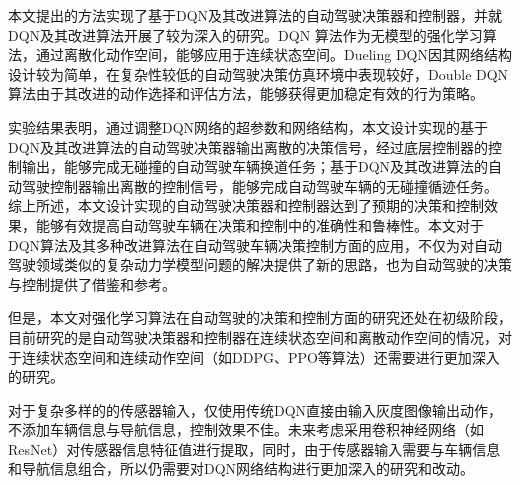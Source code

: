 %
%
%
%
%
%

\renewcommand{\thechapter}{结论}



本文提出的方法实现了基于DQN及其改进算法的自动驾驶决策器和控制器，并就DQN及其改进算法开展了较为深入的研究。DQN 算法作为无模型的强化学习算法，通过离散化动作空间，能够应用于连续状态空间。Dueling DQN因其网络结构设计较为简单，在复杂性较低的自动驾驶决策仿真环境中表现较好，Double DQN算法由于其改进的动作选择和评估方法，能够获得更加稳定有效的行为策略。

实验结果表明，通过调整DQN网络的超参数和网络结构，本文设计实现的基于DQN及其改进算法的自动驾驶决策器输出离散的决策信号，经过底层控制器的控制输出，能够完成无碰撞的自动驾驶车辆换道任务；基于DQN及其改进算法的自动驾驶控制器输出离散的控制信号，能够完成自动驾驶车辆的无碰撞循迹任务。
综上所述，本文设计实现的自动驾驶决策器和控制器达到了预期的决策和控制效果，能够有效提高自动驾驶车辆在决策和控制中的准确性和鲁棒性。本文对于DQN算法及其多种改进算法在自动驾驶车辆决策控制方面的应用，不仅为对自动驾驶领域类似的复杂动力学模型问题的解决提供了新的思路，也为自动驾驶的决策与控制提供了借鉴和参考。

但是，本文对强化学习算法在自动驾驶的决策和控制方面的研究还处在初级阶段，目前研究的是自动驾驶决策器和控制器在连续状态空间和离散动作空间的情况，对于连续状态空间和连续动作空间（如DDPG、PPO等算法）还需要进行更加深入的研究。

对于复杂多样的的传感器输入，仅使用传统DQN直接由输入灰度图像输出动作，不添加车辆信息与导航信息，控制效果不佳。未来考虑采用卷积神经网络（如ResNet\cite{targ2016resnet}）对传感器信息特征值进行提取，同时，由于传感器输入需要与车辆信息和导航信息组合，所以仍需要对DQN网络结构进行更加深入的研究和改动。
